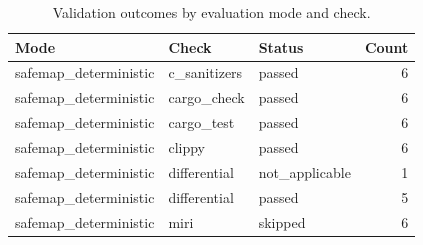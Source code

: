 \begin{table}[t]
\centering
\caption{Validation outcomes by evaluation mode and check.}
\label{tab:safemap-validation-statuses}
\begin{tabular}{lllr}
\hline
Mode & Check & Status & Count \\
\hline
safemap\_deterministic & c\_sanitizers & passed & 6 \\
safemap\_deterministic & cargo\_check & passed & 6 \\
safemap\_deterministic & cargo\_test & passed & 6 \\
safemap\_deterministic & clippy & passed & 6 \\
safemap\_deterministic & differential & not\_applicable & 1 \\
safemap\_deterministic & differential & passed & 5 \\
safemap\_deterministic & miri & skipped & 6 \\
\hline
\end{tabular}
\end{table}
